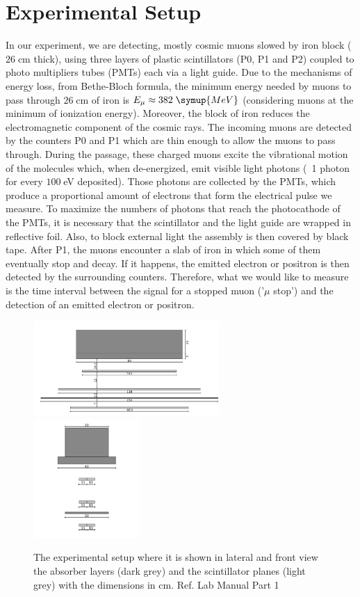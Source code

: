 \chapter{Experimental Setup}
\label{sec:setup}
	In our experiment, we are detecting, mostly cosmic muons slowed by iron block ($26\;$cm thick),
	using three layers of plastic scintillators (P0, P1 and P2) coupled to photo multipliers tubes (PMTs) each via a light guide.
	Due to the mechanisms of energy loss, from Bethe-Bloch formula, the minimum energy needed by muons to pass through 
	$26\;$cm of iron is $E_{\mu} \approx 382 \; \symup{MeV}$ (considering muons at the minimum of ionization energy).
	 Moreover, the block of iron reduces the electromagnetic component of the cosmic rays.
	The incoming muons are detected by the counters P0 and P1 which are thin enough to allow the muons to pass through.
	During the passage, these charged muons excite the vibrational motion of the molecules which, when de-energized, 
	emit visible light photons  (~1 photon for every $100\;$eV deposited). Those photons are collected by the PMTs, which
	produce a proportional amount of electrons that form the electrical pulse we measure.
	To maximize the numbers of photons that reach the photocathode of the PMTs, it is 
	necessary that the scintillator and the light guide are wrapped in reflective foil. Also, to block
	external light the assembly is then covered by black tape.
	After P1, the muons encounter a slab of iron in which some of them eventually stop and decay. If it happens,
	the emitted electron or positron is then detected by the surrounding counters. Therefore,
	what we would like to measure is the time interval between the signal for a stopped muon (’$\mu$ stop’) and the
	detection of an emitted electron or positron.
	\begin{figure}
		\centering
		\includegraphics[width=0.63\textwidth]{figures/11.png}
		\includegraphics[width=0.36\textwidth]{figures/22.png}
		\caption{The experimental setup where it is shown in lateral and front view the absorber layers (dark grey) and the scintillator planes (light grey) with the dimensions in cm. Ref. Lab Manual Part 1}
		\label{fig:Scintillators_Detectors}
	\end{figure}
